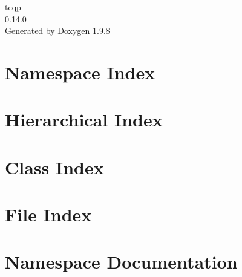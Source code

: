 \documentclass[twoside]{book}
\newcommand{\+}{\discretionary{\mbox{\scriptsize$\hookleftarrow$}}{}{}}
\newcommand{\clearemptydoublepage}{%
    \newpage{\pagestyle{empty}\cleardoublepage}%
  }
\begin{document}
  \raggedbottom
    \hypersetup{pageanchor=false,
                bookmarksnumbered=true,
                pdfencoding=unicode
               }
  \begin{titlepage}
  \vspace*{7cm}
  \begin{center}%
  {\Large teqp}\\
  [1ex]\large 0.\+14.\+0 \\
  \vspace*{1cm}
  {\large Generated by Doxygen 1.9.8}\\
  \end{center}
  \end{titlepage}
  \clearemptydoublepage
  \tableofcontents
  \clearemptydoublepage
  \hypersetup{pageanchor=true}
\chapter{Namespace Index}

\chapter{Hierarchical Index}

\chapter{Class Index}

\chapter{File Index}

\chapter{Namespace Documentation}






















\end{document}
